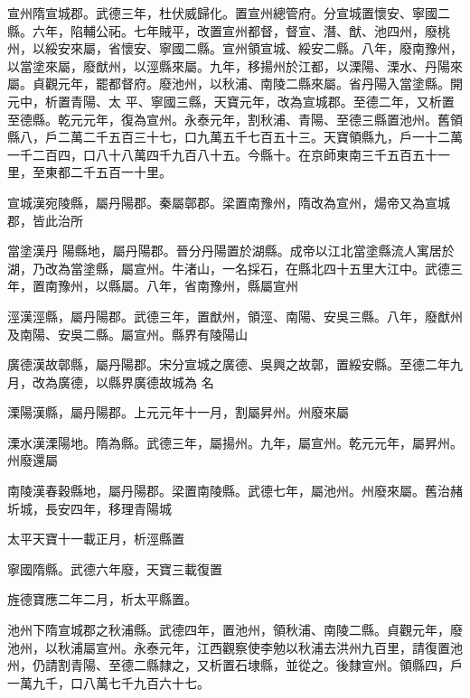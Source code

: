 \begin{pinyinscope}
 宣州隋宣城郡。武德三年，杜伏威歸化。置宣州總管府。分宣城置懷安、寧國二縣。六年，陷輔公祏。七年賊平，改置宣州都督，督宣、潛、猷、池四州，廢桃州，以綏安來屬，省懷安、寧國二縣。宣州領宣城、綏安二縣。八年，廢南豫州，以當塗來屬，廢猷州，以涇縣來屬。九年，移揚州於江都，以溧陽、溧水、丹陽來屬。貞觀元年，罷都督府。廢池州，以秋浦、南陵二縣來屬。省丹陽入當塗縣。開元中，析置青陽、太
 平、寧國三縣，天寶元年，改為宣城郡。至德二年，又析置至德縣。乾元元年，復為宣州。永泰元年，割秋浦、青陽、至德三縣置池州。舊領縣八，戶二萬二千五百三十七，口九萬五千七百五十三。天寶領縣九，戶一十二萬一千二百四，口八十八萬四千九百八十五。今縣十。在京師東南三千五百五十一里，至東都二千五百一十里。



 宣城漢宛陵縣，屬丹陽郡。秦屬鄣郡。梁置南豫州，隋改為宣州，煬帝又為宣城郡，皆此治所



 當塗漢丹
 陽縣地，屬丹陽郡。晉分丹陽置於湖縣。成帝以江北當塗縣流人寓居於湖，乃改為當塗縣，屬宣州。牛渚山，一名採石，在縣北四十五里大江中。武德三年，置南豫州，以縣屬。八年，省南豫州，縣屬宣州



 涇漢涇縣，屬丹陽郡。武德三年，置猷州，領涇、南陽、安吳三縣。八年，廢猷州及南陽、安吳二縣。屬宣州。縣界有陵陽山



 廣德漢故鄣縣，屬丹陽郡。宋分宣城之廣德、吳興之故鄣，置綏安縣。至德二年九月，改為廣德，以縣界廣德故城為
 名



 溧陽漢縣，屬丹陽郡。上元元年十一月，割屬昇州。州廢來屬



 溧水漢溧陽地。隋為縣。武德三年，屬揚州。九年，屬宣州。乾元元年，屬昇州。州廢還屬



 南陵漢春穀縣地，屬丹陽郡。梁置南陵縣。武德七年，屬池州。州廢來屬。舊治赭圻城，長安四年，移理青陽城



 太平天寶十一載正月，析涇縣置



 寧國隋縣。武德六年廢，天寶三載復置



 旌德寶應二年二月，析太平縣置。



 池州下隋宣城郡之秋浦縣。武德四年，置池州，領秋浦、南陵二縣。貞觀元年，廢池州，以秋浦屬宣州。永泰元年，江西觀察使李勉以秋浦去洪州九百里，請復置池州，仍請割青陽、至德二縣隸之，又析置石埭縣，並從之。後隸宣州。領縣四，戶一萬九千，口八萬七千九百六十七。




\end{pinyinscope}
